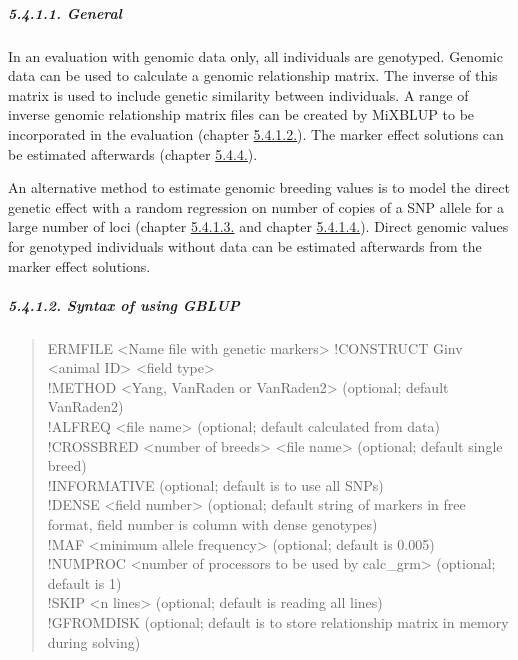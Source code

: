 \subparagraph{5.4.1.1. General}\label{Gene31}

In an evaluation with genomic data only, all individuals are genotyped.
Genomic data can be used to calculate a genomic relationship matrix. The
inverse of this matrix is used to include genetic similarity between
individuals. A range of inverse genomic relationship matrix files can be
created by MiXBLUP to be incorporated in the evaluation (chapter
\hyperref[Gene32]{5.4.1.2.}). The marker effect solutions can be
estimated afterwards (chapter \hyperref[Gene53]{5.4.4.}).

An alternative method to estimate genomic breeding values is to model
the direct genetic effect with a random regression on number of copies
of a SNP allele for a large number of loci (chapter
\hyperref[Gene33]{5.4.1.3.} and chapter \hyperref[Gene34]{5.4.1.4.}).
Direct genomic values for genotyped individuals without data can be
estimated afterwards from the marker effect solutions.

\subparagraph{5.4.1.2. Syntax of using GBLUP}\label{Gene32}

\begin{quote}
ERMFILE \textless Name file with genetic markers\textgreater{}
!CONSTRUCT Ginv\\
\textless animal ID\textgreater{} \textless field type\textgreater{}\\
!METHOD \textless Yang, VanRaden or VanRaden2\textgreater{} (optional;
default VanRaden2)\\
!ALFREQ \textless file name\textgreater{} (optional; default calculated
from data)\\
!CROSSBRED \textless number of breeds\textgreater{} \textless file
name\textgreater{} (optional; default single breed)\\
!INFORMATIVE (optional; default is to use all SNPs)\\
!DENSE \textless field number\textgreater{} (optional; default string of
markers in free format, field number is column with dense genotypes)\\
!MAF \textless minimum allele frequency\textgreater{} (optional; default
is 0.005)\\
!NUMPROC \textless number of processors to be used by
calc\_grm\textgreater{} (optional; default is 1)\\
!SKIP \textless n lines\textgreater{} (optional; default is reading all
lines)\\
!GFROMDISK (optional; default is to store relationship matrix in memory
during solving)
\end{quote}

